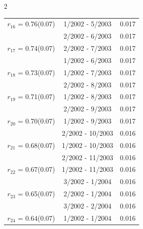 \begin{multicols}{2}
{\begin{tabular}{ccc}
  $r_{16}$ = 0.76(0.07) &       1/2002 -  5/2003 &        0.017   \vspace{-.10in} \\  
&        2/2002 -  6/2003 &        0.017  \vspace{-.02in} \\ \hline 
  $r_{17}$ = 0.74(0.07) &       2/2002 -  7/2003 &        0.017   \vspace{-.10in} \\  
&        1/2002 -  6/2003 &        0.017  \vspace{-.02in} \\ \hline 
  $r_{18}$ = 0.73(0.07) &       1/2002 -  7/2003 &        0.017   \vspace{-.10in} \\  
&        2/2002 -  8/2003 &        0.017  \vspace{-.02in} \\ \hline 
  $r_{19}$ = 0.71(0.07) &       1/2002 -  8/2003 &        0.017   \vspace{-.10in} \\  
&        2/2002 -  9/2003 &        0.017  \vspace{-.02in} \\ \hline 
  $r_{20}$ = 0.70(0.07) &       1/2002 -  9/2003 &        0.017   \vspace{-.10in} \\  
&        2/2002 - 10/2003 &        0.016  \vspace{-.02in} \\ \hline 
  $r_{21}$ = 0.68(0.07) &       1/2002 - 10/2003 &        0.016   \vspace{-.10in} \\  
&        2/2002 - 11/2003 &        0.016  \vspace{-.02in} \\ \hline 
  $r_{22}$ = 0.67(0.07) &       1/2002 - 11/2003 &        0.016   \vspace{-.10in} \\  
&        3/2002 -  1/2004 &        0.016  \vspace{-.02in} \\ \hline 
  $r_{23}$ = 0.65(0.07) &       2/2002 -  1/2004 &        0.016   \vspace{-.10in} \\  
&        3/2002 -  2/2004 &        0.016  \vspace{-.02in} \\ \hline 
  $r_{24}$ = 0.64(0.07) &       1/2002 -  1/2004 &        0.016   \vspace{-.10in} \\  

\end{tabular}}
\end{multicols}
